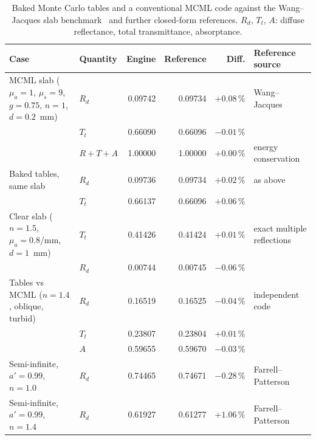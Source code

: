 \documentclass[journal]{IEEEtran}
\newcommand{\mua}{\mu_a}
\newcommand{\mus}{\mu_s}
\begin{document}
\begin{table}[!t]
\centering
\caption{Baked Monte Carlo tables and a conventional MCML code against the Wang--Jacques slab benchmark~\cite{wang1995mcml} and further closed-form references. $R_d$, $T_t$, $A$: diffuse reflectance, total transmittance, absorptance.}
\label{fig:mcml}
\footnotesize
\setlength{\tabcolsep}{3pt}
\begin{tabular}{@{}llrrrl@{}}
\toprule
Case & Quantity & Engine & Reference & Diff. & Reference source \\
\midrule
MCML slab ($\mua{=}1$, $\mus{=}9$, $g{=}0.75$, $n{=}1$, $d{=}0.2$~mm) & $R_d$ & 0.09742 & 0.09734 & $+0.08\,\%$ & Wang--Jacques \\
 & $T_t$ & 0.66090 & 0.66096 & $-0.01\,\%$ & \\
 & $R{+}T{+}A$ & 1.00000 & 1.00000 & $+0.00\,\%$ & energy conservation \\
Baked tables, same slab & $R_d$ & 0.09736 & 0.09734 & $+0.02\,\%$ & as above \\
 & $T_t$ & 0.66137 & 0.66096 & $+0.06\,\%$ & \\
Clear slab ($n{=}1.5$, $\mua{=}0.8$/mm, $d{=}1$~mm) & $T_t$ & 0.41426 & 0.41424 & $+0.01\,\%$ & exact multiple reflections \\
 & $R_d$ & 0.00744 & 0.00745 & $-0.06\,\%$ & \\
Tables vs MCML ($n{=}1.4$, oblique, turbid) & $R_d$ & 0.16519 & 0.16525 & $-0.04\,\%$ & independent code \\
 & $T_t$ & 0.23807 & 0.23804 & $+0.01\,\%$ & \\
 & $A$ & 0.59655 & 0.59670 & $-0.03\,\%$ & \\
Semi-infinite, $a'{=}0.99$, $n{=}1.0$ & $R_d$ & 0.74465 & 0.74671 & $-0.28\,\%$ & Farrell--Patterson \\
Semi-infinite, $a'{=}0.99$, $n{=}1.4$ & $R_d$ & 0.61927 & 0.61277 & $+1.06\,\%$ & Farrell--Patterson \\
\bottomrule
\end{tabular}
\end{table}
\end{document}
